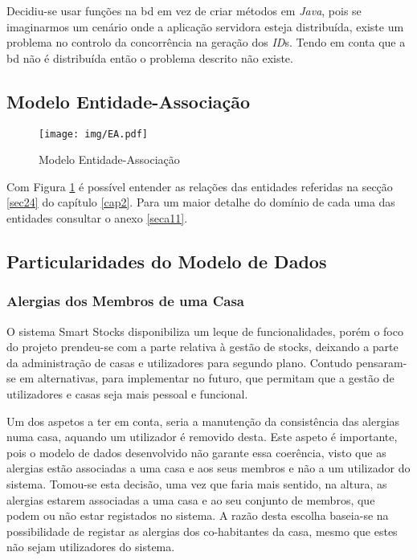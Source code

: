 Decidiu-se usar funções na \acrshort{bd} em vez de criar métodos em \textit{Java}, pois se imaginarmos um cenário onde a aplicação servidora esteja distribuída, existe um problema no controlo da concorrência na geração dos \textit{ID}s. Tendo em conta que a \acrshort{bd} não é distribuída então o problema descrito não existe.

\subsection{Modelo Entidade-Associação}\label{subsec312}

\begin{figure}
	\centering
	\texttt{[image: img/EA.pdf]}
	\caption{Modelo Entidade-Associação}
	\label{modelo-ea}
\end{figure}

Com Figura \ref{modelo-ea} é possível entender as relações das entidades referidas na secção \ref{sec24} do capítulo \ref{cap2}. Para um maior detalhe do domínio de cada uma das entidades consultar o anexo \ref{seca11}. 


\subsection{Particularidades do Modelo de Dados}

\subsubsection{Alergias dos Membros de uma Casa}

O sistema Smart Stocks disponibiliza um leque de funcionalidades, porém o foco do projeto prendeu-se com a parte relativa à gestão de stocks, deixando a parte da administração de casas e utilizadores para segundo plano. Contudo pensaram-se em alternativas, para implementar no futuro, que permitam que a gestão de utilizadores e casas seja mais pessoal e funcional. 

Um dos aspetos a ter em conta, seria a manutenção da consistência das alergias numa casa, aquando um utilizador é removido desta. Este aspeto é importante, pois o modelo de dados desenvolvido não garante essa coerência, visto que as alergias estão associadas a uma casa e aos seus membros e não a um utilizador do sistema. Tomou-se esta decisão, uma vez que faria mais sentido, na altura, as alergias estarem associadas a uma casa e ao seu conjunto de membros, que podem ou não estar registados no sistema. A razão desta escolha baseia-se na possibilidade de registar as alergias dos co-habitantes da casa, mesmo que estes não sejam utilizadores do sistema. 

